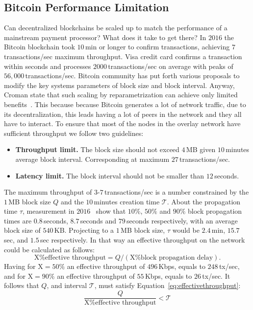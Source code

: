 \documentclass[USenglish]{uit-thesis}
\begin{document}
\subsection{Bitcoin Performance Limitation}
Can decentralized blockchains be scaled up to match the performance
of a mainstream payment processor? What does it take
to get there?
In $2016$ the Bitcoin blockchain took $10$\,min or longer
to confirm transactions, achieving $7$\,transactions/sec maximum
throughput. Visa credit card confirms a transaction within seconds
and processes $2000$\,transactions/sec on average with peaks
of $56,000$\,transactions/sec.
Bitcoin community has put forth various proposals to modify
the key systems parameters of block size and block interval.
Anyway, Croman state that such scaling by reparametrization
can achieve only limited benefits~\cite{croman2016}.
This because because Bitcoin
generates a lot of network traffic, due to its
decentralization, this leads having a lot of peers in the network
and they all have to interact. To ensure that most
of the nodes in the overlay network have sufficient
throughput we follow two guidelines:
\begin{itemize}[noitemsep]
	\item \textbf{Throughput limit.} The block size should not exceed $4$\,MB
	given $10$\,minutes average block interval. Corresponding at maximum
	$27$\,transactions/sec.
	\item \textbf{Latency limit.} The block interval should not be smaller
	than $12$\,seconds.
\end{itemize}
The maximum throughput of $3$-$7$\,transactions/sec is
a number constrained by the $1$\,MB block size $Q$ and the
$10$\,minutes creation time $\mathcal{T}$.
About the propagation time $\tau$, measurement
in $2016$~\cite{croman2016} show that
$10\%$, $50\%$ and $90\%$ block
propagation times are $0.8$\,seconds,
$8.7$\,seconds and $79$\,seconds respectively,
with an average block size of $540$\,KB.
Projecting to a $1$\,MB block size, $\tau$
would be $2.4$\,min, $15.7$\,sec, and $1.5$\,sec respectively.
In that way an effective throughput on the network
could be calculated as follows:
\[
\text{X\% effective throughput} = Q / (\text{X\% block propagation delay}).
\]
Having for $\text{X} = 50\%$ an effective throughput of $496$\,Kbps,
equals to $248$\,tx/sec, and for $\text{X} = 90\%$ an effective throughput
of $55$\,Kbps, equals to $26$\,tx/sec.
It follows that $Q$, and interval $\mathcal{T}$,
must satisfy Equation~\ref{eq:effectivethroughput}:
\begin{equation}
\label{eq:effectivethroughput}
\frac{Q}{\text{X\% effective throughput}} < \mathcal{T}
\end{equation}
\end{document}
